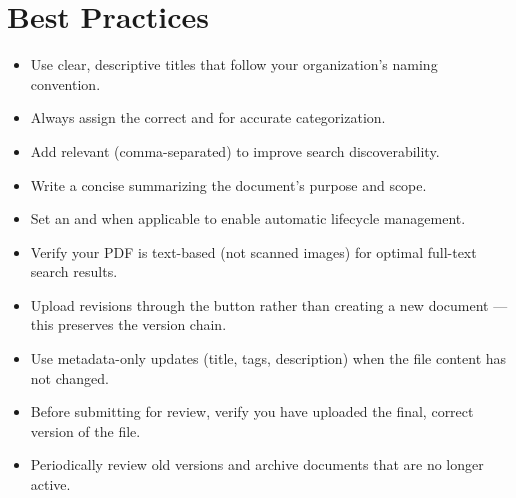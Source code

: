 \section{Best Practices}

\begin{ugBestPractice}
  \begin{itemize}[leftmargin=14pt]
    \item Use clear, descriptive titles that follow your
          organization's naming convention.
    \item Always assign the correct  and
           for accurate categorization.
    \item Add relevant  (comma-separated) to
          improve search discoverability.
    \item Write a concise  summarizing the
          document's purpose and scope.
    \item Set an  and
           when applicable to enable
          automatic lifecycle management.
    \item Verify your PDF is text-based (not scanned images)
          for optimal full-text search results.
  \end{itemize}
\end{ugBestPractice}

\vspace{6pt}

\begin{ugBestPractice}
  \begin{itemize}[leftmargin=14pt]
    \item Upload revisions through the 
          button rather than creating a new document --- this
          preserves the version chain.
    \item Use metadata-only updates (title, tags, description)
          when the file content has not changed.
    \item Before submitting for review, verify you have uploaded
          the final, correct version of the file.
    \item Periodically review old versions and archive documents
          that are no longer active.
  \end{itemize}
\end{ugBestPractice}

